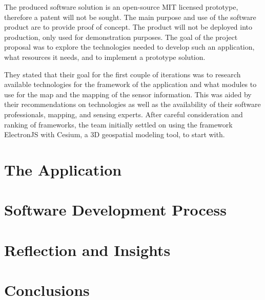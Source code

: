 \documentclass{l3proj}
\begin{document}
The produced software solution is an open-source MIT licensed prototype, therefore a patent will not be sought. The main purpose and use of the software product are to provide proof of concept. The product will not be deployed into production, only used for demonstration purposes. The goal of the project proposal was to explore the technologies needed to develop such an application, what resources it needs, and to implement a prototype solution.

They stated that their goal for the first couple of iterations was to research available technologies for the framework of the application and what modules to use for the map and the mapping of the sensor information. This was aided by their recommendations on technologies as well as the availability of their software professionals, mapping, and sensing experts. After careful consideration and ranking of frameworks, the team initially settled on using the framework ElectronJS with Cesium, a 3D geospatial modeling tool, to start with.

\section{The Application}


\section{Software Development Process}


\section{Reflection and Insights}


\section{Conclusions}





\end{document}
